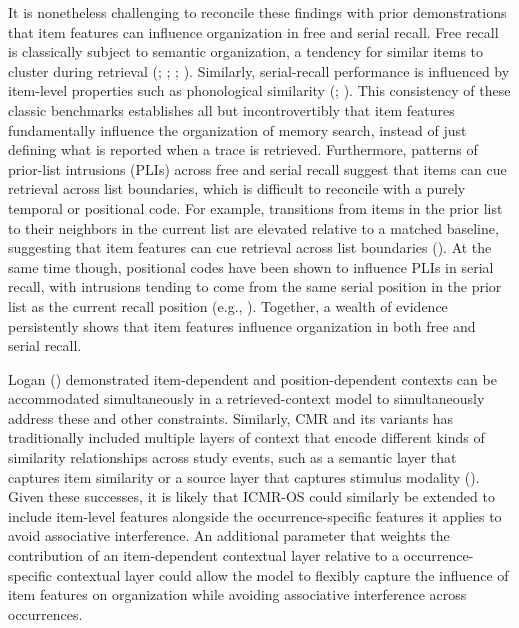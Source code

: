 \documentclass[
  man,
  floatsintext,
  longtable,
  nolmodern,
  notxfonts,
  notimes,
  draftfirst,
  colorlinks=true,linkcolor=blue,citecolor=blue,urlcolor=blue]{apa7}
\begin{document}
It is nonetheless challenging to reconcile these findings with prior
demonstrations that item features can influence organization in free and
serial recall. Free recall is classically subject to semantic
organization, a tendency for similar items to cluster during retrieval
(;
;
;
). Similarly,
serial-recall performance is influenced by item-level properties such as
phonological similarity (; ). This
consistency of these classic benchmarks establishes all but
incontrovertibly that item features fundamentally influence the
organization of memory search, instead of just defining what is reported
when a trace is retrieved. Furthermore, patterns of prior-list
intrusions (PLIs) across free and serial recall suggest that items can
cue retrieval across list boundaries, which is difficult to reconcile
with a purely temporal or positional code. For example, transitions from
items in the prior list to their neighbors in the current list are
elevated relative to a matched baseline, suggesting that item features
can cue retrieval across list boundaries
(). At the same
time though, positional codes have been shown to influence PLIs in
serial recall, with intrusions tending to come from the same serial
position in the prior list as the current recall position (e.g.,
). Together, a
wealth of evidence persistently shows that item features influence
organization in both free and serial recall.

Logan () demonstrated item-dependent
and position-dependent contexts can be accommodated simultaneously in a
retrieved-context model to simultaneously address these and other
constraints. Similarly, CMR and its variants has traditionally included
multiple layers of context that encode different kinds of similarity
relationships across study events, such as a semantic layer that
captures item similarity or a source layer that captures stimulus
modality (). Given
these successes, it is likely that ICMR-OS could similarly be extended
to include item-level features alongside the occurrence-specific
features it applies to avoid associative interference. An additional
parameter that weights the contribution of an item-dependent contextual
layer relative to a occurrence-specific contextual layer could allow the
model to flexibly capture the influence of item features on organization
while avoiding associative interference across occurrences.
\end{document}
